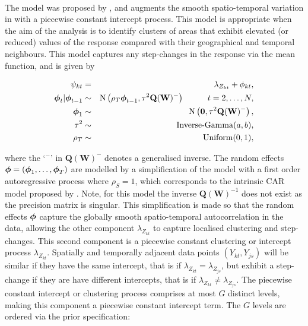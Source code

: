 \documentclass[article, nojss]{jss}
\newcommand{\bd}[1]{\ensuremath{\mbox{\boldmath $#1$}}}
\begin{document}
\\
The model was proposed by \cite{lee2016}, and augments the smooth spatio-temporal variation in  with a piecewise constant intercept process.  This model is appropriate when the aim of the analysis is to identify clusters of areas that exhibit elevated (or reduced) values of the response compared with their geographical and temporal neighbours. This model captures any step-changes in the response via the mean function, and is given by


\begin{eqnarray}
\psi_{kt}&=&\lambda_{Z_{kt}} + \phi_{kt},\label{carcluster1}\\
\bd{\phi}_t|\bd{\phi}_{t-1} & \sim & \mbox{N}\left(\rho_T\bd{\phi}_{t-1}, \tau^{2} \mathbf{Q}(\mathbf{W})^{-}\right)\hspace{1cm} t=2,\ldots,N,\nonumber\\
\bd{\phi}_1 & \sim & \mbox{N}\left(\mathbf{0}, \tau^{2} \mathbf{Q}(\mathbf{W})^{-}\right),\nonumber\\
\tau^2&\sim&\mbox{Inverse-Gamma}(a,b),\nonumber\\
\rho_T&\sim&\mbox{Uniform}(0,1),\nonumber
\end{eqnarray}

where the `$^{-}$' in $\mathbf{Q}(\mathbf{W})^{-}$ denotes a generalised inverse. The random effects $\bd{\phi}=(\bd{\phi}_{1},\ldots,\bd{\phi}_{T})$ are modelled by a simplification of the  model with a first order autoregressive process where $\rho_S=1$, which corresponds to the intrinsic CAR model proposed by \cite{besag1991}. Note, for this model the inverse $\mathbf{Q}(\mathbf{W})^{-1}$ does not exist as the precision matrix is singular. This simplification is made so that the random effects $\bd{\phi}$ capture the globally smooth spatio-temporal autocorrelation in the data, allowing the other component $\lambda_{Z_{kt}}$ to capture localised clustering and step-changes. This second component is a piecewise constant clustering or intercept process $\lambda_{Z_{kt}}$. Spatially and  temporally adjacent data points $(Y_{kt}, Y_{js})$ will be similar if they have the same intercept, that is if $\lambda_{Z_{kt}}=\lambda_{Z_{js}}$, but exhibit a step-change if they are have different intercepts, that is if $\lambda_{Z_{kt}}\neq\lambda_{Z_{js}}$. The piecewise constant intercept or clustering process  comprises at most $G$ distinct levels, making this component a piecewise constant intercept term. The $G$ levels are ordered via the prior specification:
\end{document}
